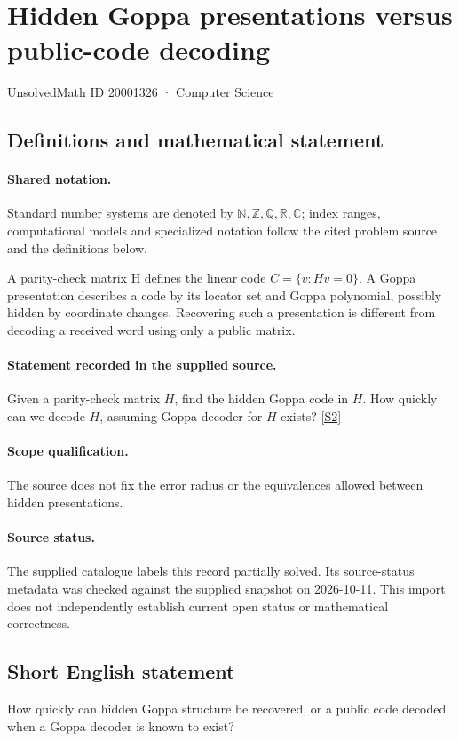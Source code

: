 \documentclass[11pt]{article}
\newcommand{\sref}[2]{\hyperlink{source:#1:#2}{[S#2]}}
\begin{document}
\setcounter{section}{20001325}
\section{Hidden Goppa presentations versus public-code decoding}\label{20001326}
{\small\sffamily UnsolvedMath ID 20001326 · Computer Science}
\subsection{Definitions and mathematical statement}

\paragraph{Shared notation.}Standard number systems are denoted by $\mathbb N,\mathbb Z,\mathbb Q,\mathbb R,\mathbb C$; index ranges, computational models and specialized notation follow the cited problem source and the definitions below.


A parity-check matrix H defines the linear code $C=\{v:Hv=0\}$. A Goppa presentation describes a code by its locator set and Goppa polynomial, possibly hidden by coordinate changes. Recovering such a presentation is different from decoding a received word using only a public matrix.
\paragraph{Statement recorded in the supplied source.}
Given a parity-check matrix $H$, find the hidden Goppa code in $H$. How quickly can we decode $H$, assuming Goppa decoder for $H$ exists? \sref{20001326}{2}
\paragraph{Scope qualification.}
The source does not fix the error radius or the equivalences allowed between hidden presentations.
\paragraph{Source status.}
The supplied catalogue labels this record partially solved. Its source-status metadata was checked against the supplied snapshot on 2026-10-11. This import does not independently establish current open status or mathematical correctness.
\subsection{Short English statement}
How quickly can hidden Goppa structure be recovered, or a public code decoded when a Goppa decoder is known to exist?
\end{document}
